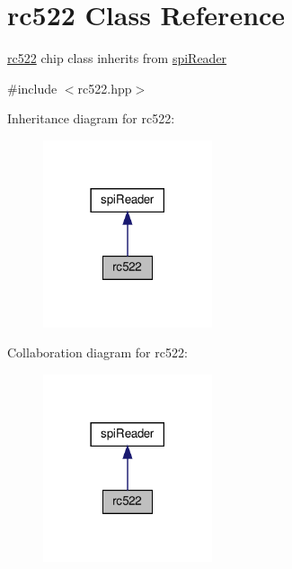 \hypertarget{classrc522}{}\section{rc522 Class Reference}
\label{classrc522}


\hyperlink{classrc522}{rc522} chip class inherits from \hyperlink{classspiReader}{spi\+Reader}  




{\ttfamily \#include $<$rc522.\+hpp$>$}



Inheritance diagram for rc522\+:
\nopagebreak
\begin{figure}[H]
\begin{center}
\leavevmode
\includegraphics[width=141pt]{classrc522__inherit__graph}
\end{center}
\end{figure}


Collaboration diagram for rc522\+:
\nopagebreak
\begin{figure}[H]
\begin{center}
\leavevmode
\includegraphics[width=141pt]{classrc522__coll__graph}
\end{center}
\end{figure}

